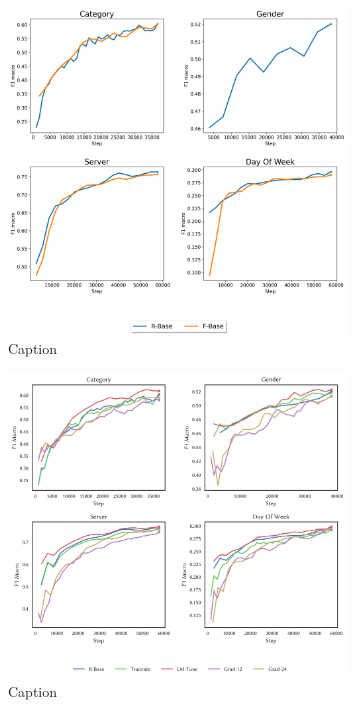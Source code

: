 \begin{figure}[ht]
    \centering
    \includegraphics[width=0.8\textwidth]{graph_create/outputs/base.png}
    \caption{Caption}
    \label{fig:base-train}
\end{figure}

\begin{figure}[ht]
    \centering
    \includegraphics[width=0.8\textwidth]{graph_create/outputs/tune.png}
    \caption{Caption}
    \label{fig:tune-train}
\end{figure}


